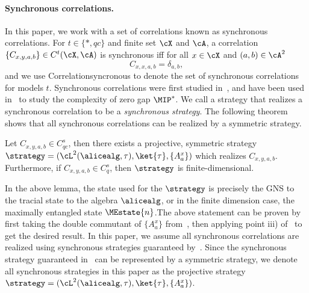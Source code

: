 \paragraph{Synchronous correlations. } In this paper, we work with a set of correlations known as synchronous correlations. For $t \in \{ *, qc\}$ and finite set $\cX$ and $\cA$, a correlation $\{ C_{x,y,a,b}\} \in C^t(\cX, \cA)$ is synchronous iff for all $x \in \cX$ and $(a,b) \in \cA^2$
\begin{equation*}
	C_{x,x,a,b} = \delta_{a,b},
\end{equation*}
and we use \gls{Correlationsyncronous} to denote the set of synchronous correlations for models $t$. Synchronous correlations were first studied in~\cite{paulsenEstimatingQuantumChromatic2016}, and have been used in~\cite{mousaviNonlocalGamesCompression2022} to study the complexity of zero gap $\MIP^*$. We call a strategy that realizes a synchronous correlation to be a \textit{synchronous strategy}. The following theorem shows that all synchronous correlations can be realized by a symmetric strategy. 
\begin{lemma} \label{lem:structsync}
	Let $C_{x,y,a,b} \in C_{qc}^s$, then there exists a projective, symmetric strategy $\strategy = (\cL^2(\alicealg, \tau), \ket{\tau}, \{A_a^x\})$ which realizes $C_{x,y,a,b}$. Furthermore, if $C_{x,y,a,b} \in C_q^s$, then $\strategy$ is finite-dimensional.
\end{lemma}
In the above lemma, the state used for the $\strategy$ is precisely the GNS to the tracial state to the algebra $\alicealg$, or in the finite dimension case, the maximally entangled state $\MEstate{n}$.The above statement can be proven by first taking the double commutant of $\{ A^x_a\}$ from~\cite[Theorem 5.5]{paulsenEstimatingQuantumChromatic2016}, then applying point iii) of~\cite[Theorem 5.5]{paulsenEstimatingQuantumChromatic2016} to get the desired result. In this paper, we assume all synchronous correlations are realized using synchronous strategies guaranteed by~. Since the synchronous strategy guaranteed in~ can be represented by a symmetric strategy, we denote all synchronous strategies in this paper as the projective strategy $\strategy = (\cL^2(\alicealg, \tau), \ket{\tau}, \{A_a^x \})$. 

